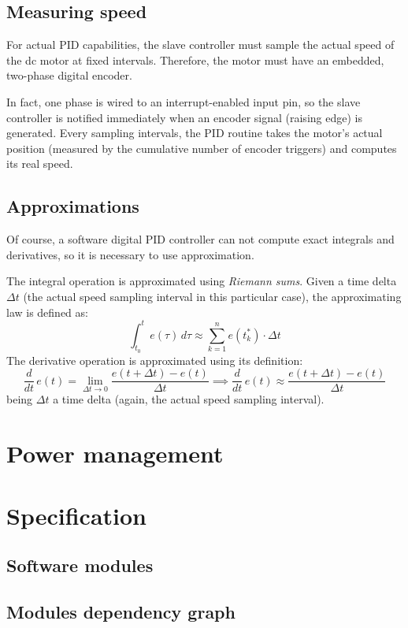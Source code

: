 \documentclass[binding=0.6cm,Lau]{sapthesis}
\begin{document}
\subsection{Measuring speed}
For actual PID capabilities, the slave controller must sample the actual speed
of the dc motor at fixed intervals. Therefore, the motor must have an embedded,
two-phase digital encoder.

In fact, one phase is wired to an interrupt-enabled input pin, so the slave
controller is notified immediately when an encoder signal (raising edge) is
generated. Every sampling intervals, the PID routine takes the motor's actual
position (measured by the cumulative number of encoder triggers) and computes
its real speed.

\subsection{Approximations}
Of course, a software digital PID controller can not compute exact integrals
and derivatives, so it is necessary to use approximation.

The integral operation is approximated using \emph{Riemann sums}. Given a time
delta $\Delta t$ (the actual speed sampling interval in this particular case),
the approximating law is defined as:
\begin{equation}
  \int_{t_0}^t e(\tau)\,d\tau \approx \sum_{k=1}^n e(t_k^*) \cdot \Delta t
\end{equation}
The derivative operation is approximated using its definition:
\begin{equation}
  \frac{d}{dt}\,e(t) = \lim_{\Delta t \to 0} \frac{e(t + \Delta t) - e(t)}{\Delta t} \implies
  \frac{d}{dt}\,e(t) \approx \frac{e(t + \Delta t) - e(t)}{\Delta t}
\end{equation}
being $\Delta t$ a time delta (again, the actual speed sampling interval).

\section{Power management}
\section{Specification}
\subsection{Software modules}
\subsection{Modules dependency graph}
\end{document}
